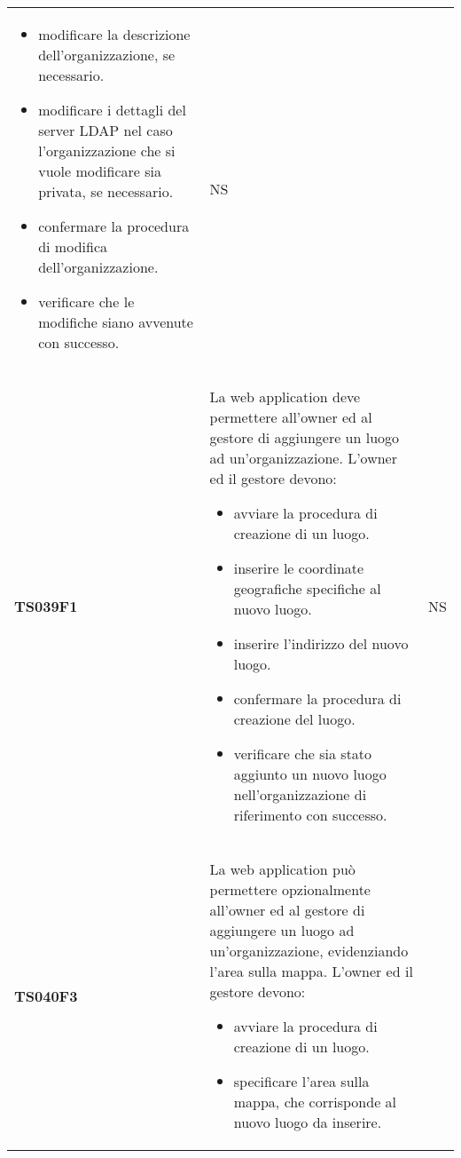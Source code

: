 \documentclass[../piano-di-qualifica.tex]{subfiles}
\begin{document}
\begin{centering}
\begin{longtable}[H]{>{\centering\bfseries}m{3cm} >{}p{10cm} >{\centering\arraybackslash}m{3cm}}
\begin{itemize}
      \item modificare la descrizione dell'organizzazione, se necessario.
      \item modificare i dettagli del server LDAP nel caso l'organizzazione che si vuole modificare sia privata, se necessario.
      \item confermare la procedura di modifica dell'organizzazione.
      \item verificare che le modifiche siano avvenute con successo.
    \end{itemize}
                       & NS                                                                                                                                                                                                                                                               \\
    TS039F1            & La web application deve permettere all'owner ed al gestore di aggiungere un luogo ad un'organizzazione. \newline
    L'owner ed il gestore devono:
    \begin{itemize}
      \item avviare la procedura di creazione di un luogo.
      \item inserire le coordinate geografiche specifiche al nuovo luogo.
      \item inserire l'indirizzo del nuovo luogo.
      \item confermare la procedura di creazione del luogo.
      \item verificare che sia stato aggiunto un nuovo luogo nell'organizzazione di riferimento con successo.
    \end{itemize}
                       & NS                                                                                                                                                                                                                                                               \\
    TS040F3            & La web application può permettere opzionalmente all'owner ed al gestore di aggiungere un luogo ad un'organizzazione, evidenziando l'area sulla mappa. \newline
    L'owner ed il gestore devono:
    \begin{itemize}
      \item avviare la procedura di creazione di un luogo.
      \item specificare l'area sulla mappa, che corrisponde al nuovo luogo da inserire.

\end{itemize}
\end{longtable}
\end{centering}
\end{document}
